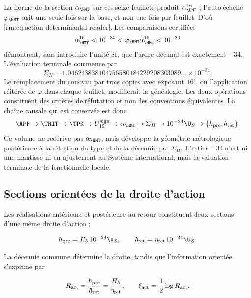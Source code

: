 La norme de la section \(\alpha_{\HMT}\) sur ces seize feuillets
produit \(\alpha_{\HMT}^{16}\) ; l'auto-échelle \(\varphi_{\HMT}\) agit
une seule fois sur la base, et non une fois par feuillet. D'où
\cref{rm:eq:action-determinantal-reader}. Les comparaisons certifiées
\begin{equation}
\alpha_{\HMT}^{16}<10^{-34}
<\varphi_{\HMT}\alpha_{\HMT}^{16}<10^{-33}
\label{rm:eq:action-decade-bounds}
\end{equation}
démontrent, sans introduire l'unité SI, que l'ordre décimal est
exactement \(-34\). L'évaluation terminale commence par
\begin{equation}
\Sigma_H
=1.046243838104756580184229208303089\ldots\times10^{-34}.
\label{rm:eq:action-sigma-value}
\end{equation}
Le remplacement du conoyau par trois copies avec exposant \(16^3\), ou
l'application réitérée de \(\varphi\) dans chaque feuillet, modifierait la
généalogie. Les deux opérations constituent des critères de réfutation et non
des conventions équivalentes.
La chaîne causale qui est conservée est donc
\[
\APP\to\TRIT\to\TPK\to U_{12}^{\rm sign}
\to\alpha_{\HMT}\to\Sigma_H
\to10^{-34}\U_S\to
\{\hbar_{\rm pre},\hbar_{\rm ret}\}.
\]
Ce volume ne redérive pas \(\alpha_{\HMT}\), mais développe la géométrie
métrologique postérieure à la sélection du type et de la décennie par
\(\Sigma_H\). L'entier \(-34\) n'est ni une mantisse ni un ajustement au Système
international, mais la valuation terminale de la fonctionnelle locale.

\subsection{Sections orientées de la droite d'action}

Les réalisations antérieure et postérieure au retour constituent deux sections
d'une même droite d'action :

\begin{equation}
\hbar_{\rm pre}=H_5\,10^{-34}\U_S,\qquad
\hbar_{\rm ret}=\eta_{\rm ret}\,10^{-34}\U_S.
\label{rm:eq:action-twoway}
\end{equation}

La décennie commune détermine la droite, tandis que l'information
orientée s'exprime par

\begin{equation}
R_{\rm act}=\frac{\hbar_{\rm pre}}{\hbar_{\rm ret}}
=\frac{H_5}{\eta_{\rm ret}},
\qquad
\xi_{\rm act}=\frac12\log R_{\rm act}.
\label{rm:eq:action-rapidity}
\end{equation}


